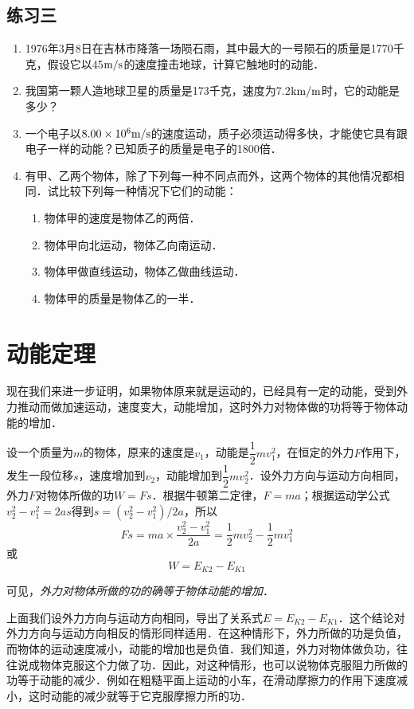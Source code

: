 \subsection*{练习三}
\begin{enumerate}
    \item 1976年3月8日在吉林市降落一场陨石雨，其中最大的一号陨石的质量是1770千克，假设它以45$\text{m}/\text{s}$的速度撞击地球，计算它触地时的动能．
    \item 我国第一颗人造地球卫星的质量是173千克，速度为7.2${\rm km}/{\rm m}$时，它的动能是多少？
    \item 一个电子以$8.00\times 10^6\text{m}/\text{s}$的速度运动，质子必须运动得多快，才能使它具有跟电子一样的动能？已知质子的质量是电子的1800倍．
    \item 有甲、乙两个物体，除了下列每一种不同点而外，这两个物体的其他情况都相同．试比较下列每一种情况下它们的动能：
    \begin{enumerate}
        \item 物体甲的速度是物体乙的两倍．
        \item 物体甲向北运动，物体乙向南运动．
        \item 物体甲做直线运动，物体乙做曲线运动．
        \item 物体甲的质量是物体乙的一半．
    \end{enumerate}
\end{enumerate}

\section{动能定理}

现在我们来进一步证明，如果物体原来就是运动的，已经具有一定的动能，受到外力推动而做加速运动，速度变大，动能增加，这时外力对物体做的功将等于物体动能的增加．

设一个质量为$m$的物体，原来的速度是$v_1$，动能是$\dfrac{1}{2}mv^2_1$，在恒定的外力$F$作用下，发生一段位移$s$，速度增加到$v_2$，动能增加到$\dfrac{1}{2}mv^2_2$．设外力方向与运动方向相同，外力$F$对物体所做的功$W=Fs$．根据牛顿第二定律，$F=ma$；根据运动学公式$v^2_2-v^2_1=2as$得到$s=(v^2_2-v^2_1)/2a$，所以
\[Fs=ma\times \frac{v^2_2-v^2_1}{2a}=\frac{1}{2}mv^2_2-\frac{1}{2}mv^2_1 \]
或
\[W=E_{K2}-E_{K1}\]

可见，\textit{外力对物体所做的功的确等于物体动能的增加}．

上面我们设外力方向与运动方向相同，导出了关系式$E=E_{K2}-E_{K1}$．这个结论对外力方向与运动方向相反的情形同样适用．在这种情形下，外力所做的功是负值，而物体的运动速度减小，动能的增加也是负值．我们知道，外力对物体做负功，往往说成物体克服这个力做了功．因此，对这种情形，也可以说物体克服阻力所做的功等于动能的减少．例如在粗糙平面上运动的小车，在滑动摩擦力的作用下速度减小，这时动能的减少就等于它克服摩擦力所的功．	
	
